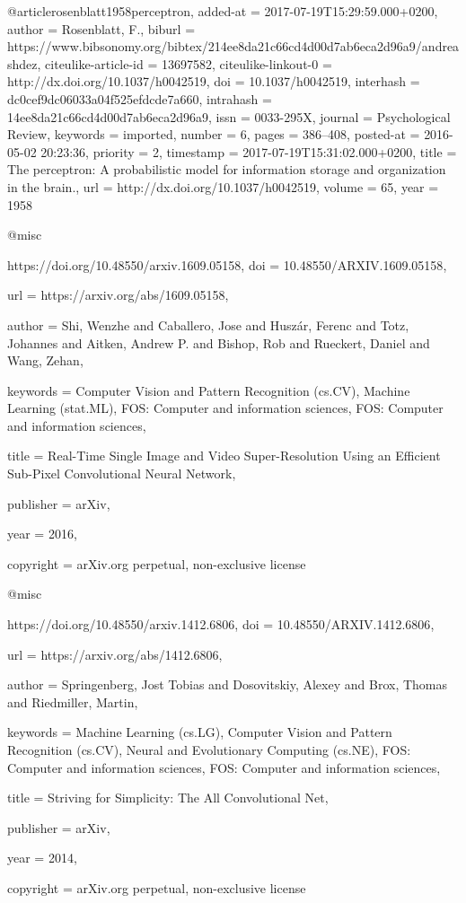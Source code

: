 @article{rosenblatt1958perceptron,
  added-at = {2017-07-19T15:29:59.000+0200},
  author = {Rosenblatt, F.},
  biburl = {https://www.bibsonomy.org/bibtex/214ee8da21c66cd4d00d7ab6eca2d96a9/andreashdez},
  citeulike-article-id = {13697582},
  citeulike-linkout-0 = {http://dx.doi.org/10.1037/h0042519},
  doi = {10.1037/h0042519},
  interhash = {dc0cef9dc06033a04f525efdcde7a660},
  intrahash = {14ee8da21c66cd4d00d7ab6eca2d96a9},
  issn = {0033-295X},
  journal = {Psychological Review},
  keywords = {imported},
  number = 6,
  pages = {386--408},
  posted-at = {2016-05-02 20:23:36},
  priority = {2},
  timestamp = {2017-07-19T15:31:02.000+0200},
  title = {{The perceptron: A probabilistic model for information storage and organization in the brain.}},
  url = {http://dx.doi.org/10.1037/h0042519},
  volume = 65,
  year = 1958
}

@misc{https://doi.org/10.48550/arxiv.1609.05158,
  doi = {10.48550/ARXIV.1609.05158},
  
  url = {https://arxiv.org/abs/1609.05158},
  
  author = {Shi, Wenzhe and Caballero, Jose and Huszár, Ferenc and Totz, Johannes and Aitken, Andrew P. and Bishop, Rob and Rueckert, Daniel and Wang, Zehan},
  
  keywords = {Computer Vision and Pattern Recognition (cs.CV), Machine Learning (stat.ML), FOS: Computer and information sciences, FOS: Computer and information sciences},
  
  title = {Real-Time Single Image and Video Super-Resolution Using an Efficient Sub-Pixel Convolutional Neural Network},
  
  publisher = {arXiv},
  
  year = {2016},
  
  copyright = {arXiv.org perpetual, non-exclusive license}
}

@misc{https://doi.org/10.48550/arxiv.1412.6806,
  doi = {10.48550/ARXIV.1412.6806},
  
  url = {https://arxiv.org/abs/1412.6806},
  
  author = {Springenberg, Jost Tobias and Dosovitskiy, Alexey and Brox, Thomas and Riedmiller, Martin},
  
  keywords = {Machine Learning (cs.LG), Computer Vision and Pattern Recognition (cs.CV), Neural and Evolutionary Computing (cs.NE), FOS: Computer and information sciences, FOS: Computer and information sciences},
  
  title = {Striving for Simplicity: The All Convolutional Net},
  
  publisher = {arXiv},
  
  year = {2014},
  
  copyright = {arXiv.org perpetual, non-exclusive license}
}

